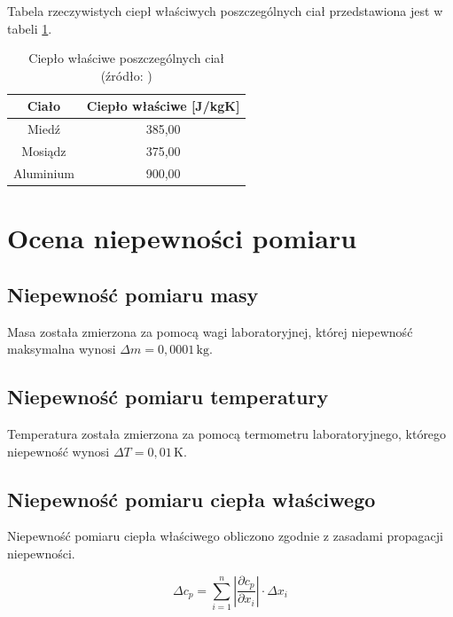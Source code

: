 \documentclass[a4paper,12pt]{article}
\begin{document}
Tabela rzeczywistych ciepł właściwych poszczególnych ciał przedstawiona jest w tabeli \ref{tab:cieplo_wlasciwe_rzeczywiste}.

\begin{table}[H]
    \centering
    \begin{tabular}{|c|c|}
        \hline
        \textbf{Ciało} & \textbf{Ciepło właściwe [J/kgK]} \\
        \hline
        Miedź & 385{,}00 \\
        \hline
        Mosiądz & 375{,}00 \\
        \hline
        Aluminium & 900{,}00 \\
        \hline
    \end{tabular}
    \caption{Ciepło właściwe poszczególnych ciał (źródło: \cite{cieplo_wlasciwe_tabele})}
    \label{tab:cieplo_wlasciwe_rzeczywiste}
\end{table}




\section{Ocena niepewności pomiaru}

\subsection{Niepewność pomiaru masy}

Masa została zmierzona za pomocą wagi laboratoryjnej, której niepewność maksymalna wynosi $\Delta m = 0{,}0001\,\text{kg}$.

\subsection{Niepewność pomiaru temperatury}

Temperatura została zmierzona za pomocą termometru laboratoryjnego, którego niepewność wynosi $\Delta T = 0{,}01\,\text{K}$.

\subsection{Niepewność pomiaru ciepła właściwego}

Niepewność pomiaru ciepła właściwego obliczono zgodnie z zasadami propagacji niepewności.

\begin{equation}
    \Delta c_p = \sum_{i=1}^{n} \left | \frac{\partial c_p}{\partial x_i} \right | \cdot \Delta x_i
\end{equation}
\end{document}
